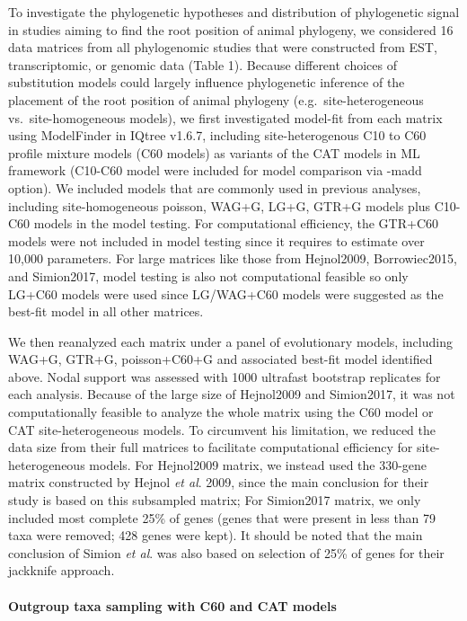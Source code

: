 \documentclass[]{article}
\let\oldparagraph\paragraph
\renewcommand{\paragraph}[1]{\oldparagraph{#1}\mbox{}}
\begin{document}
To investigate the phylogenetic hypotheses and distribution of
phylogenetic signal in studies aiming to find the root position of
animal phylogeny, we considered 16 data matrices from all phylogenomic
studies that were constructed from EST, transcriptomic, or genomic data
(Table 1). Because different choices of substitution models could
largely influence phylogenetic inference of the placement of the root
position of animal phylogeny (e.g.~site-heterogeneous
vs.~site-homogeneous models), we first investigated model-fit from each
matrix using ModelFinder in IQtree v1.6.7, including site-heterogenous
C10 to C60 profile mixture models (C60 models) as variants of the CAT
models in ML framework (C10-C60 model were included for model comparison
via -madd option). We included models that are commonly used in previous
analyses, including site-homogeneous poisson, WAG+G, LG+G, GTR+G models
plus C10-C60 models in the model testing. For computational efficiency,
the GTR+C60 models were not included in model testing since it requires
to estimate over 10,000 parameters. For large matrices like those from
Hejnol2009, Borrowiec2015, and Simion2017, model testing is also not
computational feasible so only LG+C60 models were used since LG/WAG+C60
models were suggested as the best-fit model in all other matrices.

We then reanalyzed each matrix under a panel of evolutionary models,
including WAG+G, GTR+G, poisson+C60+G and associated best-fit model
identified above. Nodal support was assessed with 1000 ultrafast
bootstrap replicates for each analysis. Because of the large size of
Hejnol2009 and Simion2017, it was not computationally feasible to
analyze the whole matrix using the C60 model or CAT site-heterogeneous
models. To circumvent his limitation, we reduced the data size from
their full matrices to facilitate computational efficiency for
site-heterogeneous models. For Hejnol2009 matrix, we instead used the
330-gene matrix constructed by Hejnol \emph{et al}. 2009, since the main
conclusion for their study is based on this subsampled matrix; For
Simion2017 matrix, we only included most complete 25\% of genes (genes
that were present in less than 79 taxa were removed; 428 genes were
kept). It should be noted that the main conclusion of Simion \emph{et
al}. was also based on selection of 25\% of genes for their jackknife
approach.

\hypertarget{outgroup-taxa-sampling-with-c60-and-cat-models}{%
\paragraph{Outgroup taxa sampling with C60 and CAT
models}\label{outgroup-taxa-sampling-with-c60-and-cat-models}}
\end{document}

